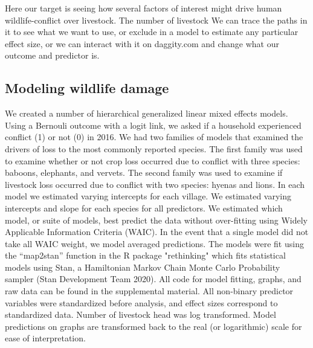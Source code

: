 \documentclass[12pt,]{article}
\begin{document}
\begin{figure}[!h]
\centering
{}
\end{figure}

Here our target is seeing how several factors of interest might drive human wildlife-conflict over livestock. The number of livestock
We can trace the paths in it to see what we want to use, or exclude in a model to estimate any particular effect size, or we can interact with it on daggity.com and change what our outcome and predictor is.

\subsection{Modeling wildlife damage}

We created a number of hierarchical generalized linear mixed effects models. Using a Bernouli outcome with a logit link, we asked if a household experienced conflict (1) or not (0) in 2016. We had two families of models that examined the drivers of loss to the most commonly reported species. The first family was used to examine whether or not crop loss occurred due to conflict with three species: baboons, elephants, and vervets. The second family was used to examine if livestock loss occurred due to conflict with two species: hyenas and lions. In each model we estimated varying intercepts for each village. We estimated varying intercepts and slope for each species for all predictors. We estimated which model, or suite of models, best predict the data without over-fitting using Widely Applicable Information Criteria (WAIC). In the event that a single model did not take all WAIC weight, we model averaged predictions. The models were fit using the ``map2stan'' function in the R package "rethinking" \citep{McElreath2020a} which fits statistical models using Stan, a Hamiltonian Markov Chain Monte Carlo Probability sampler (Stan Development Team 2020). All code for model fitting, graphs, and raw data can be found in the supplemental material. %
All non-binary predictor variables were standardized before analysis, and effect sizes correspond to standardized data. Number of livestock head was log transformed. Model predictions on graphs are transformed back to the real (or logarithmic) scale for ease of interpretation.
\end{document}

